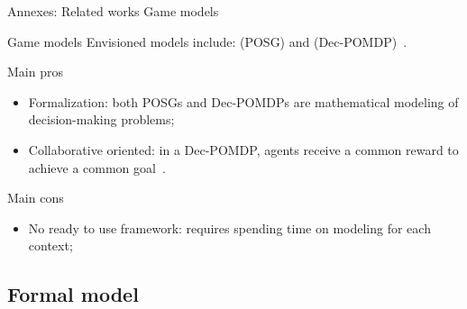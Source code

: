 	\begin{frame}{Annexes: Related works}
		{Game models}

            \begin{block}{Game models}
                Envisioned  models include:  (POSG) and  (Dec-POMDP)~\cite{beynier2010}.

            \end{block}

            \begin{prosblock}{Main pros}
                \begin{itemize}
                    \item Formalization: both POSGs and Dec-POMDPs are mathematical modeling of decision-making problems;
                    \item Collaborative oriented: in a Dec-POMDP, agents receive a common reward to achieve a common goal~\cite{bernstein2013}.
                \end{itemize}
            \end{prosblock}

            \begin{consblock}{Main cons}
                \begin{itemize}
                    \item No ready to use framework: requires spending time on modeling for each context;
                \end{itemize}
            \end{consblock}

	\end{frame}

        \subsection{Formal model}
	
